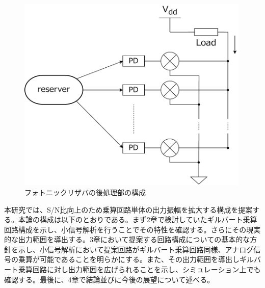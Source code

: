 \begin{figure}
        \begin{center}
        \includegraphics[width=0.99\textwidth]{figures/chapter1/config.pdf}
        \caption{フォトニックリザバの後処理部の構成}
        \label{fig:1_config}
    \end{center}
\end{figure}
\par
本研究では、S/N比向上のため乗算回路単体の出力振幅を拡大する構成を提案する。本論の構成は以下のとおりである。まず2章で検討していたギルバート乗算回路構成を示し、小信号解析を行うことでその特性を確認する。さらにその現実的な出力範囲を導出する。3章において提案する回路構成についての基本的な方針を示し、小信号解析において提案回路がギルバート乗算回路同様、アナログ信号の乗算が可能であることを明らかにする。また、その出力範囲を導出しギルバート乗算回路に対し出力範囲を広げられることを示し、シミュレーション上でも確認する。最後に、4章で結論並びに今後の展望について述べる。